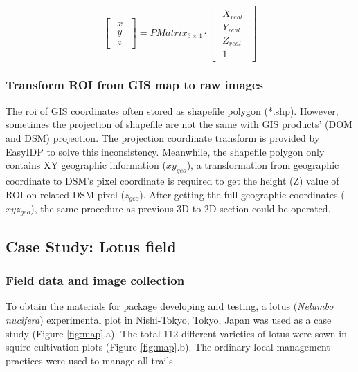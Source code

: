\documentclass[doublespacing]{configs/bmcart}
\begin{document}
$$
\begin{bmatrix}\begin{matrix} x \\ y \\ z\end{matrix}\end{bmatrix}
= PMatrix_{3\times4} \cdot 
\begin{bmatrix}\begin{matrix} 
  X_{real} \\ Y_{real} \\ Z_{real} \\ 1
\end{matrix}\end{bmatrix} 
$$

\subsubsection*{Transform ROI from GIS map to raw images}
The \acrshort*{roi} of GIS coordinates often stored as shapefile polygon (*.shp). However, sometimes the projection of shapefile are not the same with GIS products' (DOM and DSM) projection. The projection coordinate transform is provided by EasyIDP to solve this inconsistency. Meanwhile, the shapefile polygon only contains XY geographic information ($xy_{geo}$), a transformation from geographic coordinate to DSM's pixel coordinate is required to get the height (Z) value of ROI on related DSM pixel ($z_{geo}$). After getting the full geographic coordinates ($xyz_{geo}$), the same procedure as previous 3D to 2D section could be operated.

\subsection*{Case Study: Lotus field}

\subsubsection*{Field data and image collection}
To obtain the materials for package developing and testing, a lotus (\textit{Nelumbo nucifera}) experimental plot in Nishi-Tokyo, Tokyo, Japan was used as a case study (Figure \ref{fig:map}.a). The total 112 different varieties of lotus were sown in squire cultivation plots (Figure \ref{fig:map}.b). The ordinary local management practices were used to manage all trails.
\end{document}
